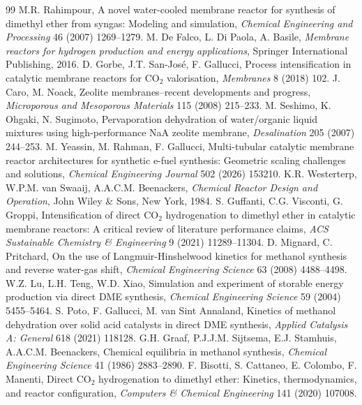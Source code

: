 \documentclass[12pt,a4paper]{article}
\begin{document}
\begin{thebibliography}{99}
 M.R. Rahimpour, A novel water-cooled membrane reactor for synthesis of dimethyl ether from syngas: Modeling and simulation, \textit{Chemical Engineering and Processing} 46 (2007) 1269--1279.
 M. De Falco, L. Di Paola, A. Basile, \textit{Membrane reactors for hydrogen production and energy applications}, Springer International Publishing, 2016.
 D. Gorbe, J.T. San-Jos\'e, F. Gallucci, Process intensification in catalytic membrane reactors for $\text{CO}_2$ valorisation, \textit{Membranes} 8 (2018) 102.
 J. Caro, M. Noack, Zeolite membranes--recent developments and progress, \textit{Microporous and Mesoporous Materials} 115 (2008) 215--233.
 M. Seshimo, K. Ohgaki, N. Sugimoto, Pervaporation dehydration of water/organic liquid mixtures using high-performance NaA zeolite membrane, \textit{Desalination} 205 (2007) 244--253.
 M. Yeassin, M. Rahman, F. Gallucci, Multi-tubular catalytic membrane reactor architectures for synthetic e-fuel synthesis: Geometric scaling challenges and solutions, \textit{Chemical Engineering Journal} 502 (2026) 153210.
 K.R. Westerterp, W.P.M. van Swaaij, A.A.C.M. Beenackers, \textit{Chemical Reactor Design and Operation}, John Wiley \& Sons, New York, 1984.
 S. Guffanti, C.G. Visconti, G. Groppi, Intensification of direct $\text{CO}_2$ hydrogenation to dimethyl ether in catalytic membrane reactors: A critical review of literature performance claims, \textit{ACS Sustainable Chemistry \& Engineering} 9 (2021) 11289--11304.
 D. Mignard, C. Pritchard, On the use of Langmuir-Hinshelwood kinetics for methanol synthesis and reverse water-gas shift, \textit{Chemical Engineering Science} 63 (2008) 4488--4498.
 W.Z. Lu, L.H. Teng, W.D. Xiao, Simulation and experiment of storable energy production via direct DME synthesis, \textit{Chemical Engineering Science} 59 (2004) 5455--5464.
 S. Poto, F. Gallucci, M. van Sint Annaland, Kinetics of methanol dehydration over solid acid catalysts in direct DME synthesis, \textit{Applied Catalysis A: General} 618 (2021) 118128.
 G.H. Graaf, P.J.J.M. Sijtsema, E.J. Stamhuis, A.A.C.M. Beenackers, Chemical equilibria in methanol synthesis, \textit{Chemical Engineering Science} 41 (1986) 2883--2890.
 F. Bisotti, S. Cattaneo, E. Colombo, F. Manenti, Direct $\text{CO}_2$ hydrogenation to dimethyl ether: Kinetics, thermodynamics, and reactor configuration, \textit{Computers \& Chemical Engineering} 141 (2020) 107008.

\end{thebibliography}
\end{document}
